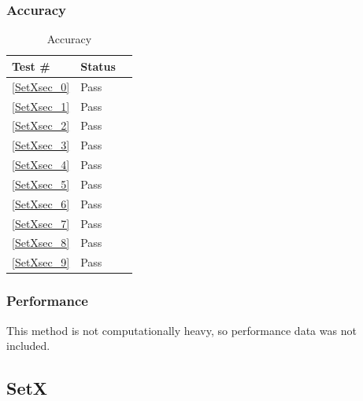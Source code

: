 \documentclass[12pt]{article}
\begin{document}
	\subsubsection{Accuracy}
		\begin{table}[H]
		\centering
		\caption{Accuracy}\label{GetY_acc}
		\begin{tabular}{lll}
		\toprule
		\bf Test \# & Status \\\midrule
		\ref{SetXsec_0} & Pass\\
		\ref{SetXsec_1} & Pass\\
		\ref{SetXsec_2} & Pass\\
		\ref{SetXsec_3} & Pass\\
		\ref{SetXsec_4} & Pass\\
		\ref{SetXsec_5} & Pass\\
		\ref{SetXsec_6} & Pass\\
		\ref{SetXsec_7} & Pass\\
		\ref{SetXsec_8} & Pass\\
		\ref{SetXsec_9} & Pass\\
		\bottomrule
		\end{tabular}
		\end{table}
	\subsubsection{Performance}
		This method is not computationally heavy, so performance data was not included.
		
\subsection{SetX}
\end{document}

